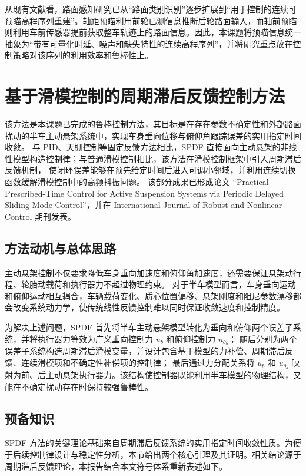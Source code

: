 从现有文献看，路面感知研究已从“路面类别识别”逐步扩展到“用于控制的连续可预瞄高程序列重建”\cite{liang2022experimental,zhang2022vehicle}。轴距预瞄利用前轮已测信息推断后轮路面输入\cite{pang2019preview,zhao2019wheelbase,liu2023superwheelbase}，而轴前预瞄则利用车前传感器提前获取整车轨迹上的路面信息\cite{wu2020preview,youn2022antijerk}。因此，本课题将预瞄信息统一抽象为“带有可量化时延、噪声和缺失特性的连续高程序列”，并将研究重点放在控制策略对该序列的利用效率和鲁棒性上。

\section{基于滑模控制的周期滞后反馈控制方法}
\label{sec:spdf_method}

该方法是本课题已完成的鲁棒控制方法，其目标是在存在参数不确定性和外部路面扰动的半车主动悬架系统中，实现车身垂向位移与俯仰角跟踪误差的实用指定时间收敛。
与 PID、天棚控制等固定反馈方法相比，SPDF 直接面向主动悬架的非线性模型构造控制律；与普通滑模控制相比，该方法在滑模控制框架中引入周期滞后反馈机制，
使闭环误差能够在预先给定时间后进入可调小邻域，并利用连续切换函数缓解滑模控制中的高频抖振问题。
该部分成果已形成论文 ``Practical Prescribed-Time Control for Active Suspension Systems via Periodic Delayed Sliding Mode Control''，并在 International Journal of Robust and Nonlinear Control 期刊发表。

\subsection{方法动机与总体思路}
主动悬架控制不仅要求降低车身垂向加速度和俯仰角加速度，还需要保证悬架动行程、轮胎动载荷和执行器力不超过物理约束。
对于半车模型而言，车身垂向运动和俯仰运动相互耦合，车辆载荷变化、质心位置偏移、悬架刚度和阻尼参数漂移都会改变系统动力学，使传统线性反馈控制难以同时保证收敛速度和控制精度。

为解决上述问题，SPDF 首先将半车主动悬架模型转化为垂向和俯仰两个误差子系统，并将执行器力等效为广义垂向控制力 $u_b$ 和俯仰控制力 $u_{\theta_b}$；
随后分别为两个误差子系统构造周期滞后滑模变量，并设计包含基于模型的力补偿、周期滞后反馈、连续滑模项和不确定性补偿项的控制律；
最后通过力分配关系将 $u_b$ 和 $u_{\theta_b}$ 映射为前、后主动悬架执行器力。该结构使控制器既能利用半车模型的物理结构，又能在不确定扰动存在时保持较强鲁棒性。

\subsection{预备知识}
SPDF 方法的关键理论基础来自周期滞后反馈系统的实用指定时间收敛性质。为便于后续控制律设计与稳定性分析，本节给出两个核心引理及其证明。相关结论源于周期滞后反馈理论\cite{zhou2021fixed,ding2025spdf}，本报告结合本文符号体系重新表述如下。

